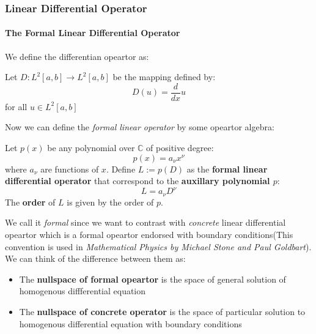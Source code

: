 \subsubsection{Linear Differential Operator}

\paragraph{The Formal Linear Differential Operator}

We define the differentian opeartor as:

\begin{definition}Let $D:L^2[a,b]\to L^2[a,b]$ be the mapping defined by:
\begin{equation}
D(u)=\frac{d}{dx}u
\end{equation}
for all $u\in L^2[a,b]$

\end{definition}Now we can define the \textit{formal linear operator} by some opeartor algebra:

\begin{definition}Let $p(x)$ be any polynomial over $\mathbb{C}$ of positive degree:
\begin{equation}
p(x)=a_\nu x^\nu
\end{equation}
where $a_{\nu}$ are functions of $x$. Define $L:=p(D)$ as the \textbf{formal linear differential operator} that correspond to the \textbf{auxillary polynomial $p$}:
\begin{equation}
L=a_\nu D^{\nu}
\end{equation}
The \textbf{order} of $L$ is given by the order of $p$.

\end{definition}We call it \textit{formal} since we want to contrast with \textit{concrete} linear differential opeartor which is a formal opeartor endorsed with boundary conditions(This convention is used in \textit{Mathematical Physics by Michael Stone and Paul Goldbart}). We can think of the difference between them as:

\begin{itemize}
\item The \textbf{nullspace of formal opeartor} is the space of general solution of homogenous diffferential equation
\item The \textbf{nullspace of concrete operator} is the space of particular solution to homogenous differential equation with boundary conditions
\end{itemize}


